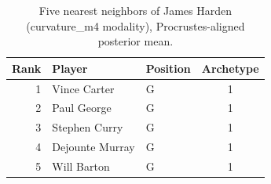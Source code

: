 \begin{table}[htbp]
  \centering\small
  \begin{tabular}{rllc}
    \toprule
    Rank & Player & Position & Archetype \\
    \midrule
    1 & Vince Carter & G & 1 \\
    2 & Paul George & G & 1 \\
    3 & Stephen Curry & G & 1 \\
    4 & Dejounte Murray & G & 1 \\
    5 & Will Barton & G & 1 \\
    \bottomrule
  \end{tabular}
  \caption{Five nearest neighbors of James Harden (curvature_m4 modality), Procrustes-aligned posterior mean.}
  \label{tab:James_Harden_neighbors_curvature_m4}
\end{table}

